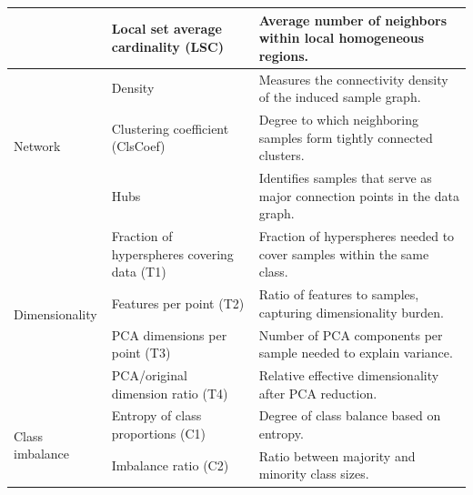 \documentclass[preprint,12pt,authoryear]{elsarticle}
\begin{document}
\begin{table}[h!]
{\begin{tabular}{lll}
 & Local set average cardinality (LSC) & Average number of neighbors within local homogeneous regions. \\
\midrule
\multirow{3}{*}{Network}
 & Density & Measures the connectivity density of the induced sample graph. \\
 & Clustering coefficient (ClsCoef) & Degree to which neighboring samples form tightly connected clusters. \\
 & Hubs & Identifies samples that serve as major connection points in the data graph. \\
\midrule
\multirow{4}{*}{Dimensionality}
 & Fraction of hyperspheres covering data (T1) & Fraction of hyperspheres needed to cover samples within the same class. \\
 & Features per point (T2) & Ratio of features to samples, capturing dimensionality burden. \\
 & PCA dimensions per point (T3) & Number of PCA components per sample needed to explain variance. \\
 & PCA/original dimension ratio (T4) & Relative effective dimensionality after PCA reduction. \\
\midrule
\multirow{2}{*}{Class imbalance}
 & Entropy of class proportions (C1) & Degree of class balance based on entropy. \\
 & Imbalance ratio (C2) & Ratio between majority and minority class sizes. \\
\bottomrule
\end{tabular}
}
\end{table}
\end{document}
